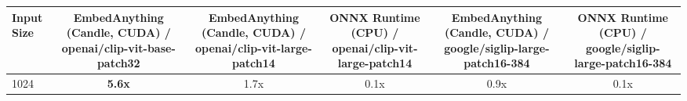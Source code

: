 \begin{tabular}{lccccc}
\toprule
\textbf{Input Size} & \textbf{EmbedAnything (Candle, CUDA) / openai/clip-vit-base-patch32} & \textbf{EmbedAnything (Candle, CUDA) / openai/clip-vit-large-patch14} & \textbf{ONNX Runtime (CPU) / openai/clip-vit-large-patch14} & \textbf{EmbedAnything (Candle, CUDA) / google/siglip-large-patch16-384} & \textbf{ONNX Runtime (CPU) / google/siglip-large-patch16-384} \\
\midrule
1024 & \textbf{5.6x} & 1.7x & 0.1x & 0.9x & 0.1x \\
\bottomrule
\end{tabular}
